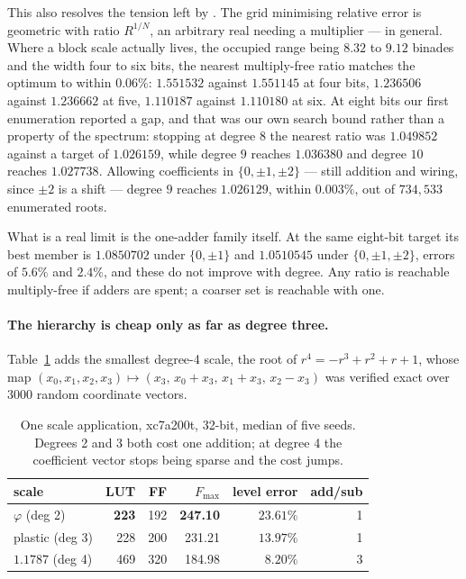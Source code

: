This also resolves the tension left by . The grid
minimising relative error is geometric with ratio $R^{1/N}$, an arbitrary real
needing a multiplier --- in general. Where a block scale actually lives, the
occupied range being $8.32$ to $9.12$ binades and the width four to six bits,
the nearest multiply-free ratio matches the optimum to within $0.06\%$:
$1.551532$ against $1.551145$ at four bits, $1.236506$ against $1.236662$ at
five, $1.110187$ against $1.110180$ at six. At eight bits our first enumeration reported a gap, and that was our own search
bound rather than a property of the spectrum: stopping at degree $8$ the nearest
ratio was $1.049852$ against a target of $1.026159$, while degree $9$ reaches
$1.036380$ and degree $10$ reaches $1.027738$. Allowing coefficients in
$\{0,\pm1,\pm2\}$ --- still addition and wiring, since $\pm2$ is a shift ---
degree $9$ reaches $1.026129$, within $0.003\%$, out of $734{,}533$ enumerated
roots.

What is a real limit is the one-adder family itself. At the same eight-bit
target its best member is $1.0850702$ under $\{0,\pm1\}$ and $1.0510545$ under
$\{0,\pm1,\pm2\}$, errors of $5.6\%$ and $2.4\%$, and these do not improve with
degree. Any ratio is reachable multiply-free if adders are spent; a coarser set
is reachable with one.

\paragraph{The hierarchy is cheap only as far as degree three.}
Table~\ref{tab:deg4} adds the smallest degree-4 scale, the root of
$r^4=-r^3+r^2+r+1$, whose map $(x_0,x_1,x_2,x_3)\mapsto(x_3,\,x_0{+}x_3,\,
x_1{+}x_3,\,x_2{-}x_3)$ was verified exact over $3000$ random coordinate
vectors.

\begin{table}[t]\centering
\caption{One scale application, xc7a200t, 32-bit, median of five seeds. Degrees
2 and 3 both cost one addition; at degree 4 the coefficient vector stops being
sparse and the cost jumps.}
\label{tab:deg4}
\begin{tabular}{lrrrrr}
\toprule
scale & LUT & FF & $F_{\max}$ & level error & add/sub \\
\midrule
$\varphi$ (deg 2)      & \textbf{223} & 192 & \textbf{247.10} & $23.61\%$ & 1 \\
plastic (deg 3)        & 228 & 200 & 231.21 & $13.97\%$ & 1 \\
$1.1787$ (deg 4)       & 469 & 320 & 184.98 & $\mathbf{8.20\%}$ & 3 \\
\bottomrule
\end{tabular}
\end{table}


